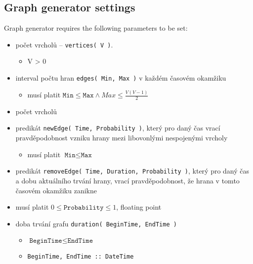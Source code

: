 \documentclass[11pt, a4paper,draft]{article}
\newcommand{\pl}[1]{\texttt{#1}} %
\theoremstyle{plain}
\theoremstyle{definition}
\theoremstyle{remark}
\begin{document}
\subsection{Graph generator settings}
\label{sec:generator-settings}

Graph generator requires the following parameters to be set:
\begin{itemize}
    \item počet vrcholů -- \pl{vertices( V )}.
        \begin{itemize}
            \item V > 0
        \end{itemize}
    \item interval počtu hran \pl{edges( Min, Max )} v každém časovém okamžiku
        \begin{itemize}
            \item musí platit $\pl{Min} \le \pl{Max} \land Max \le \frac{ V(V-1)}{2}$
        \end{itemize}
    \item počet vrcholů
    \item predikát \pl{newEdge( Time, Probability )}, který pro daný čas vrací
          pravděpodobnost vzniku hrany mezi libovonlými nespojenými vrcholy
        \begin{itemize}
            \item musí platit $\pl{Min} \le \pl{Max}$
        \end{itemize}
    \item predikát \pl{removeEdge( Time, Duration, Probability )}, který pro daný čas
    a dobu aktuálního trvání hrany, vrací pravděpodobnost, že hrana v tomto
    časovém okamžiku zanikne
    \item musí platit $0 \le \pl{Probability} \le 1$, floating point
    \item doba trvání grafu \pl{duration( BeginTime, EndTime )}
        \begin{itemize}
            \item $\pl{BeginTime} \le \pl{EndTime}$
            \item \texttt{BeginTime, EndTime :: DateTime}
        \end{itemize}
\end{itemize}
\end{document}
